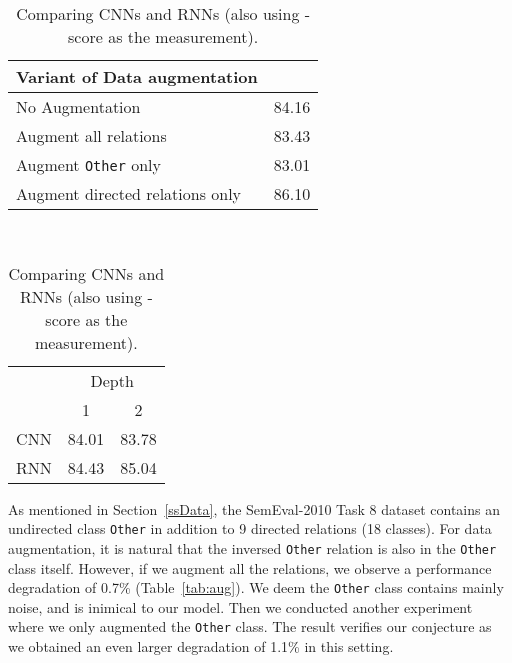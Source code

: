 \documentclass[11pt]{article}
\begin{document}
\begin{table}[!t]
\centering
\bigskip
\begin{minipage}{0.55\textwidth}
\centering
\begin{tabular}{lc}
\hline
\textbf{Variant of Data augmentation\quad\quad} & \textbf{}\\
\hline
No Augmentation & 84.16\\
Augment all relations     & 83.43\\
Augment {\tt Other} only & 83.01\\
Augment directed relations only & 86.10\\
\hline
\end{tabular}
\caption{Comparing variants of data augmentation.}\label{tab:aug}
\end{minipage}~~
\begin{minipage}{.4\textwidth}
\centering
\begin{tabular}{c|cc}
\hline
 & \multicolumn{2}{c}{Depth}\\
 \cline{2-3}
 & \hspace{.3cm}1\hspace{.3cm} &\hspace{.3cm} 2\hspace{.3cm}\\
\hline
\hspace{.3cm}CNN \hspace{.3cm}&\hspace{.3cm} 84.01 \hspace{.3cm}& \hspace{.3cm}83.78\hspace{.3cm}\\
\hspace{.3cm}RNN \hspace{.3cm}&\hspace{.3cm} 84.43 \hspace{.3cm}& \hspace{.3cm}85.04\hspace{.3cm}\\
\hline
\end{tabular}
\caption{Comparing CNNs and RNNs (also using -score as the measurement).}\label{tab:CNN}
\end{minipage}
\end{table}


As mentioned in Section~\ref{ssData}, the SemEval-2010 Task 8 dataset contains an undirected class {\tt Other} in addition to 9 directed relations (18 classes). For data augmentation, it is natural that the inversed {\tt Other} relation is also in the {\tt Other} class itself. However, if we augment all the relations, we observe a performance degradation of 0.7\% (Table~\ref{tab:aug}). We deem the {\tt Other} class contains mainly noise, and is inimical to our model. Then we conducted another experiment where we only augmented the {\tt Other} class. The result verifies our conjecture as we obtained an even larger degradation of 1.1\% in this setting.
\end{document}
